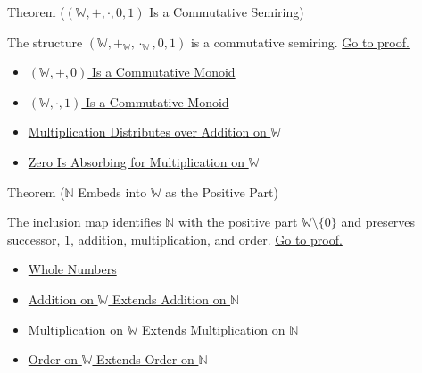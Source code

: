 \begin{theorembox}{Theorem (\texorpdfstring{$(\mathbb{W},+,\cdot,0,1)$}{(W,+,*,0,1)} Is a Commutative Semiring)}
\begin{theorem}
\label{thm:w-commutative-semiring}
The structure
$(\mathbb{W},+_{\mathbb{W}},\cdot_{\mathbb{W}},0,1)$ is a commutative
semiring.
\hyperref[prf:w-commutative-semiring]{Go to proof.}
\end{theorem}
\end{theorembox}

\begin{dependencies}
\begin{itemize}
  \item \hyperref[thm:w-additive-commutative-monoid]{$(\mathbb{W},+,0)$ Is a Commutative Monoid}
  \item \hyperref[thm:w-multiplicative-commutative-monoid]{$(\mathbb{W},\cdot,1)$ Is a Commutative Monoid}
  \item \hyperref[thm:multiplication-distributes-over-addition-on-w]{Multiplication Distributes over Addition on $\mathbb{W}$}
  \item \hyperref[thm:zero-absorbing-for-multiplication-on-w]{Zero Is Absorbing for Multiplication on $\mathbb{W}$}
\end{itemize}
\end{dependencies}

\begin{theorembox}{Theorem (\texorpdfstring{$\mathbb{N}$}{N} Embeds into \texorpdfstring{$\mathbb{W}$}{W} as the Positive Part)}
\begin{theorem}
\label{thm:n-embeds-into-w-as-positive-part}
The inclusion map identifies $\mathbb{N}$ with the positive part
$\mathbb{W}\setminus\{0\}$ and preserves successor, $1$, addition,
multiplication, and order.
\hyperref[prf:n-embeds-into-w-as-positive-part]{Go to proof.}
\end{theorem}
\end{theorembox}

\begin{dependencies}
\begin{itemize}
  \item \hyperref[def:whole-numbers]{Whole Numbers}
  \item \hyperref[thm:addition-on-w-extends-addition-on-n]{Addition on $\mathbb{W}$ Extends Addition on $\mathbb{N}$}
  \item \hyperref[thm:multiplication-on-w-extends-multiplication-on-n]{Multiplication on $\mathbb{W}$ Extends Multiplication on $\mathbb{N}$}
  \item \hyperref[thm:order-on-w-extends-order-on-n]{Order on $\mathbb{W}$ Extends Order on $\mathbb{N}$}
\end{itemize}
\end{dependencies}

